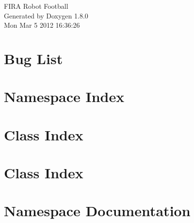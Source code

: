\documentclass{book}
\begin{document}
\hypersetup{pageanchor=false,citecolor=blue}
\begin{titlepage}
\vspace*{7cm}
\begin{center}
{\Large F\-I\-R\-A Robot Football }\\
\vspace*{1cm}
{\large Generated by Doxygen 1.8.0}\\
\vspace*{0.5cm}
{\small Mon Mar 5 2012 16:36:26}\\
\end{center}
\end{titlepage}
\clearemptydoublepage
{}
\tableofcontents
\clearemptydoublepage
{}
\hypersetup{pageanchor=true,citecolor=blue}
\chapter{Bug List}
\label{bug}
\hypertarget{bug}{}

\chapter{Namespace Index}

\chapter{Class Index}

\chapter{Class Index}

\chapter{Namespace Documentation}










\end{document}
